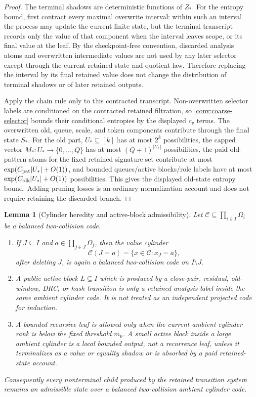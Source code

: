 \documentclass[11pt]{article}
\newcommand{\Cref}[1]{\ref{#1}}
\newtheorem{lemma}[theorem]{Lemma}
\theoremstyle{remark}
\newcommand{\C}{\mathcal C}
\begin{document}
\begin{proof}
The terminal shadows are deterministic functions of $Z_*$.  For the entropy bound, first contract every maximal overwrite interval: within such an interval the process may update the current finite state, but the terminal transcript records only the value of that component when the interval leaves scope, or its final value at the leaf.  By the checkpoint-free convention, discarded analysis atoms and overwritten intermediate values are not used by any later selector except through the current retained state and quotient law.  Therefore replacing the interval by its final retained value does not change the distribution of terminal shadows or of later retained outputs.

Apply the chain rule only to this contracted transcript.  Non-overwritten selector labels are conditioned on the contracted retained filtration, so \Cref{conv:coarse-selector} bounds their conditional entropies by the displayed $c_v$ terms.  The overwritten old, queue, scale, and token components contribute through the final state $S_*$.  For the old part, $U_*\subseteq[k]$ has at most $2^k$ possibilities, the capped vector $M_*:U_*\to\{0,\ldots,Q\}$ has at most $(Q+1)^{|U_*|}$ possibilities, the paid old-pattern atoms for the fixed retained signature set contribute at most $\exp(C_{\rm pat}|U_*|+O(1))$, and bounded queues/active blocks/role labels have at most $\exp(C_{\rm blk}|U_*|+O(1))$ possibilities.  This gives the displayed old-state entropy bound.  Adding pruning losses is an ordinary normalization account and does not require retaining the discarded branch.

\end{proof}

\begin{lemma}[Cylinder heredity and active-block admissibility]\label{lem:cylinder-active-admissibility}
Let $\C\subseteq\prod_{i\in I}\Omega_i$ be a balanced two-collision code.
\begin{enumerate}[label=\textup{(\roman*)}]
\item If $J\subseteq I$ and $a\in\prod_{j\in J}\Omega_j$, then the value cylinder
\[
        \C(J=a)=\{x\in\C:x_J=a\},
\]
after deleting $J$, is again a balanced two-collision code on $I\setminus J$.
\item A public active block $L\subseteq I$ which is produced by a close-pair, residual, old-window, DRC, or hash transition is only a retained analysis label inside the same ambient cylinder code.  It is not treated as an independent projected code for induction.
\item A bounded recursive leaf is allowed only when the current ambient cylinder rank is below the fixed threshold $m_0$.  A small active block inside a large ambient cylinder is a local bounded output, not a recurrence leaf, unless it terminalizes as a value or equality shadow or is absorbed by a paid retained-state account.
\end{enumerate}
Consequently every nonterminal child produced by the retained transition system remains an admissible state over a balanced two-collision ambient cylinder code.
\end{lemma}
\end{document}

